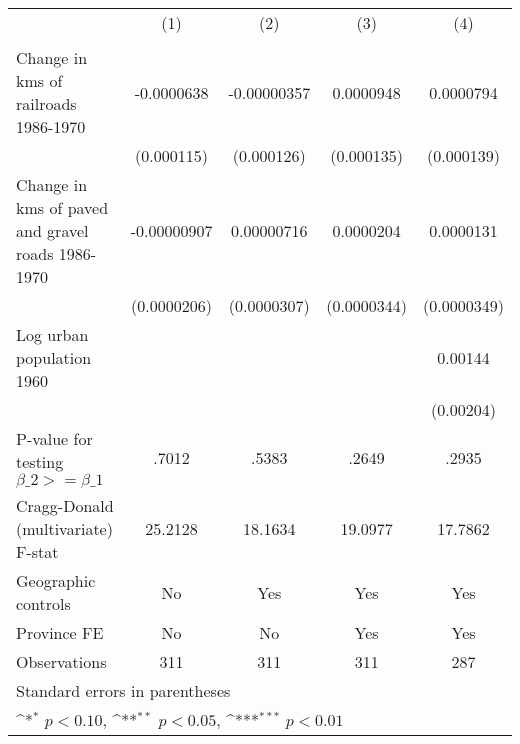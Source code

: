 {
\def\sym#1{\ifmmode^{#1}\else\(^{#1}\)\fi}
\begin{tabular}{l*{4}{c}}
\hline\hline
                &\multicolumn{1}{c}{(1)}&\multicolumn{1}{c}{(2)}&\multicolumn{1}{c}{(3)}&\multicolumn{1}{c}{(4)}\\
                &\multicolumn{1}{c}{}&\multicolumn{1}{c}{}&\multicolumn{1}{c}{}&\multicolumn{1}{c}{}\\
\hline
Change in kms of railroads 1986-1970&-0.0000638         &-0.00000357         &0.0000948         &0.0000794         \\
                &(0.000115)         &(0.000126)         &(0.000135)         &(0.000139)         \\
[1em]
Change in kms of paved and gravel roads 1986-1970&-0.00000907         &0.00000716         &0.0000204         &0.0000131         \\
                &(0.0000206)         &(0.0000307)         &(0.0000344)         &(0.0000349)         \\
[1em]
Log urban population 1960&                  &                  &                  &  0.00144         \\
                &                  &                  &                  &(0.00204)         \\
\hline
P-value for testing $\beta\_{2} >= \beta\_{1}$&    .7012         &    .5383         &    .2649         &    .2935         \\
Cragg-Donald (multivariate) F-stat&  25.2128         &  18.1634         &  19.0977         &  17.7862         \\
Geographic controls&       No         &      Yes         &      Yes         &      Yes         \\
Province FE     &       No         &       No         &      Yes         &      Yes         \\
Observations    &      311         &      311         &      311         &      287         \\
\hline\hline
\multicolumn{5}{l}{\footnotesize Standard errors in parentheses}\\
\multicolumn{5}{l}{\footnotesize \sym{*} \(p<0.10\), \sym{**} \(p<0.05\), \sym{***} \(p<0.01\)}\\
\end{tabular}
}

